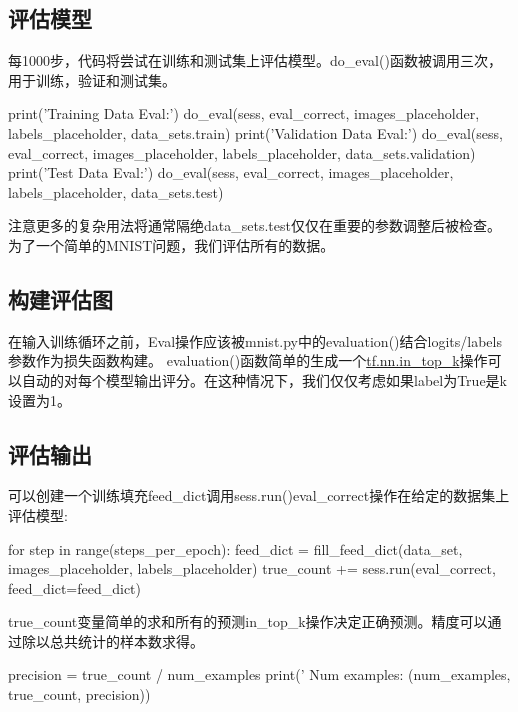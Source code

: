 \subsection{评估模型}
每1000步，代码将尝试在训练和测试集上评估模型。do\_eval()函数被调用三次，用于训练，验证和测试集。
\begin{pythoncode}
print('Training Data Eval:')
do_eval(sess,
        eval_correct,
        images_placeholder,
        labels_placeholder,
        data_sets.train)
print('Validation Data Eval:')
do_eval(sess,
        eval_correct,
        images_placeholder,
        labels_placeholder,
        data_sets.validation)
print('Test Data Eval:')
do_eval(sess,
        eval_correct,
        images_placeholder,
        labels_placeholder,
        data_sets.test)

\end{pythoncode}
注意更多的复杂用法将通常隔绝data\_sets.test仅仅在重要的参数调整后被检查。为了一个简单的MNIST问题，我们评估所有的数据。
\subsection{构建评估图}
在输入训练循环之前，Eval操作应该被mnist.py中的evaluation()结合logits/labels参数作为损失函数构建。\newline
{}\newline
evaluation()函数简单的生成一个\href{https://www.tensorflow.org/api_docs/python/tf/nn/in_top_k}{tf.nn.in\_top\_k}操作可以自动的对每个模型输出评分。在这种情况下，我们仅仅考虑如果label为True是k设置为1。\newline
{}
\subsection{评估输出}
可以创建一个训练填充feed\_dict调用sess.run()eval\_correct操作在给定的数据集上评估模型:
\begin{pythoncode}
for step in range(steps_per_epoch):
    feed_dict = fill_feed_dict(data_set,
                               images_placeholder,
                               labels_placeholder)
    true_count += sess.run(eval_correct, feed_dict=feed_dict)
\end{pythoncode}
true\_count变量简单的求和所有的预测in\_top\_k操作决定正确预测。精度可以通过除以总共统计的样本数求得。
\begin{pythoncode}
precision = true_count / num_examples
print('  Num examples: %
      (num_examples, true_count, precision))
\end{pythoncode}
